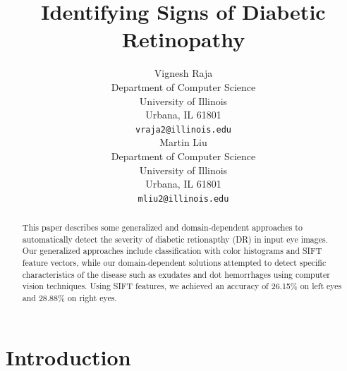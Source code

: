 \documentclass{article} %
\title{Identifying Signs of Diabetic Retinopathy}
\author{
Vignesh Raja\\
Department of Computer Science\\
University of Illinois\\
Urbana, IL 61801 \\
\texttt{vraja2@illinois.edu} \\
\And
Martin Liu \\
Department of Computer Science \\
University of Illinois\\
Urbana, IL 61801 \\
\texttt{mliu2@illinois.edu} \\
}
\begin{document}
\maketitle

\begin{abstract}
This paper describes some generalized and domain-dependent approaches to automatically detect the severity of diabetic retionapthy (DR) in input eye images. Our generalized approaches include classification with color histograms and SIFT feature vectors, while our domain-dependent solutions attempted to detect specific characteristics of the disease such as exudates and dot hemorrhages using computer vision techniques. Using SIFT features, we achieved an accuracy of 26.15\% on left eyes and 28.88\% on right eyes.%
\end{abstract}

\section{Introduction}
\end{document}
